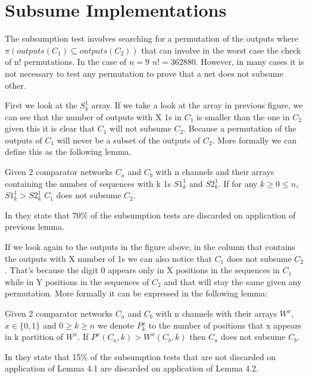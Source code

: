 \documentclass[../main.tex]{subfiles}
\begin{document}
	\section{Subsume Implementations}
		The subsumption test involves searching for a permutation of the outputs where $\pi(outputs(C_1) \subseteq outputs(C_2))$ that can involve in the worst case the check of n! permutations. In the case of $n=9$ $n! = 362880$. However, in many cases it is not necessary to test any permutation to prove that a net does not subsume other. 
	
	First we look at the $S^{1}_k$ array. If we take a look at the array in previous figure, we can see that the number of outputs with X 1s in $C_1$ is smaller than the one in $C_2$ given this it is clear that $C_1$ will not subsume $C_2$. Because a permutation of the outputs of $C_1$ will never be a subset of the outputs of $C_2$. More formally we can define this as the following lemma.
	
	\begin{lemma}
		Given 2 comparator networks $C_a$ and $C_b$ with n channels and their arrays containing the number of sequences with k 1s $S1^{1}_k$ and $S2^{1}_k$. If for any $k\geq 0 \leq n$, $S1^{1}_k > S2^{1}_k$ $C_1$ does not subsume $C_2$.
	\end{lemma}
	
	In \cite{sortingnineinputs} they state that 70\% of the subsumption tests are discarded on application of previous lemma.
	
	If we look again to the outputs in the figure above, in the column that contains the outputs with X number of 1s we can also notice that $C_1$ does not subsume $C_2$. That's because the digit 0 appears only in X positions in the sequences in $C_1$ while in Y positions in the sequences of $C_2$ and that will stay the same given any permutation. More formally it can be expressed in the following lemma:
	
	\begin{lemma}
		Given 2 comparator networks $C_a$ and $C_b$ with n channels with their arrays $W^x$, $x \in \{0,1\}$ and $0\geq k \geq n$ we denote $P{^x_k}$ to the number of positions that x appears in k partition of $W^x$. If $P^x(C_a, k) > W^x(C_b, k)$ then $C_a$ does not subsume $C_b$.
	\end{lemma}
	
	In \cite{sortingnineinputs} they state that 15\% of the subsumption tests that are not discarded on application of Lemma 4.1 are discarded on application of Lemma 4.2.
	
\end{document}
